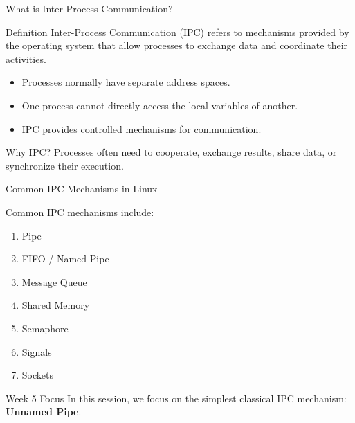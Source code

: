 \documentclass[aspectratio=169]{beamer}
\begin{document}
\begin{frame}{What is Inter-Process Communication?}

\begin{block}{Definition}
Inter-Process Communication (IPC) refers to mechanisms provided by the
operating system that allow processes to exchange data and coordinate
their activities.
\end{block}

\begin{itemize}
    \item Processes normally have separate address spaces.
    \item One process cannot directly access the local variables of another.
    \item IPC provides controlled mechanisms for communication.
\end{itemize}

\begin{alertblock}{Why IPC?}
Processes often need to cooperate, exchange results, share data,
or synchronize their execution.
\end{alertblock}

\end{frame}

\begin{frame}{Common IPC Mechanisms in Linux}

Common IPC mechanisms include:

\begin{enumerate}
    \item Pipe
    \item FIFO / Named Pipe
    \item Message Queue
    \item Shared Memory
    \item Semaphore
    \item Signals
    \item Sockets
\end{enumerate}

\vspace{0.3cm}

\begin{block}{Week 5 Focus}
In this session, we focus on the simplest classical IPC mechanism:
\textbf{Unnamed Pipe}.
\end{block}

\end{frame}
\end{document}
